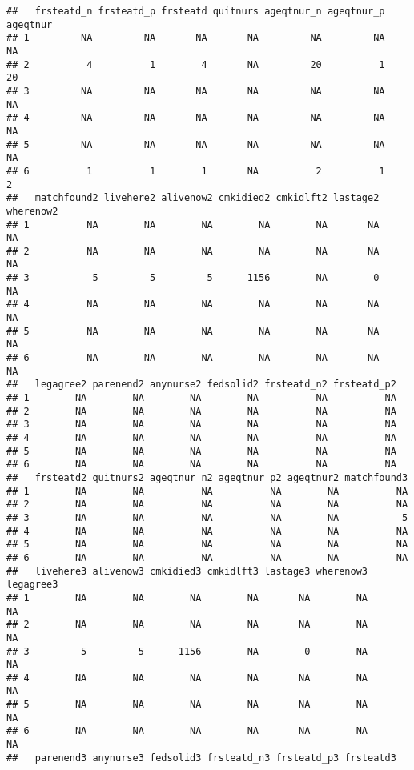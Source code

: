 \documentclass[]{article}
\begin{document}
\begin{verbatim}
##   frsteatd_n frsteatd_p frsteatd quitnurs ageqtnur_n ageqtnur_p ageqtnur
## 1         NA         NA       NA       NA         NA         NA       NA
## 2          4          1        4       NA         20          1       20
## 3         NA         NA       NA       NA         NA         NA       NA
## 4         NA         NA       NA       NA         NA         NA       NA
## 5         NA         NA       NA       NA         NA         NA       NA
## 6          1          1        1       NA          2          1        2
##   matchfound2 livehere2 alivenow2 cmkidied2 cmkidlft2 lastage2 wherenow2
## 1          NA        NA        NA        NA        NA       NA        NA
## 2          NA        NA        NA        NA        NA       NA        NA
## 3           5         5         5      1156        NA        0        NA
## 4          NA        NA        NA        NA        NA       NA        NA
## 5          NA        NA        NA        NA        NA       NA        NA
## 6          NA        NA        NA        NA        NA       NA        NA
##   legagree2 parenend2 anynurse2 fedsolid2 frsteatd_n2 frsteatd_p2
## 1        NA        NA        NA        NA          NA          NA
## 2        NA        NA        NA        NA          NA          NA
## 3        NA        NA        NA        NA          NA          NA
## 4        NA        NA        NA        NA          NA          NA
## 5        NA        NA        NA        NA          NA          NA
## 6        NA        NA        NA        NA          NA          NA
##   frsteatd2 quitnurs2 ageqtnur_n2 ageqtnur_p2 ageqtnur2 matchfound3
## 1        NA        NA          NA          NA        NA          NA
## 2        NA        NA          NA          NA        NA          NA
## 3        NA        NA          NA          NA        NA           5
## 4        NA        NA          NA          NA        NA          NA
## 5        NA        NA          NA          NA        NA          NA
## 6        NA        NA          NA          NA        NA          NA
##   livehere3 alivenow3 cmkidied3 cmkidlft3 lastage3 wherenow3 legagree3
## 1        NA        NA        NA        NA       NA        NA        NA
## 2        NA        NA        NA        NA       NA        NA        NA
## 3         5         5      1156        NA        0        NA        NA
## 4        NA        NA        NA        NA       NA        NA        NA
## 5        NA        NA        NA        NA       NA        NA        NA
## 6        NA        NA        NA        NA       NA        NA        NA
##   parenend3 anynurse3 fedsolid3 frsteatd_n3 frsteatd_p3 frsteatd3

\end{verbatim}
\end{document}
